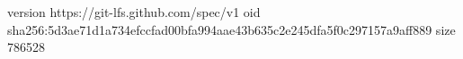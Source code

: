 version https://git-lfs.github.com/spec/v1
oid sha256:5d3ae71d1a734efccfad00bfa994aae43b635c2e245dfa5f0c297157a9aff889
size 786528
